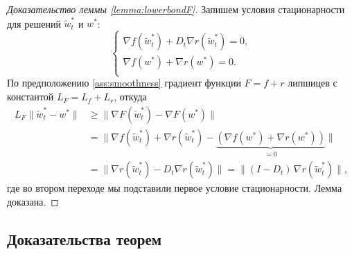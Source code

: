 \begin{proof}[Доказательство леммы \ref{lemma:lowerbondF}]
    Запишем условия стационарности для решений $\widetilde{w}^*_t$ и $w^*$:
        \begin{equation*}
        \begin{cases}
            \nabla f (\widetilde{w}^*_t) + D_t \nabla r(\widetilde{w}^*_t) = 0,\\
            \nabla f (w^*) + \nabla r(w^*) = 0.\\
        \end{cases}
        \end{equation*}
        По предположению \ref{ass:smoothness} градиент функции $F = f + r$ липшицев с константой $L_F = L_f + L_r$, откуда
        \begin{equation*}
        \begin{split}
        L_F \|\widetilde{w}^*_t - w^* \| &\geq \| \nabla F(\widetilde{w}^*_t) - \nabla F(w^*)\| \\
        &= \| \nabla f (\widetilde{w}^*_t) + \nabla r(\widetilde{w}^*_t) - \underbrace{\left(\nabla f (w^*) + \nabla r (w^*)\right)}_{=0} \| \\
        &= \| \nabla r(\widetilde{w}^*_t) - D_t \nabla r (\widetilde{w}^*_t) \|  = \| (I - D_t)\, \nabla r (\widetilde{w}^*_t) \|,
        \end{split}
        \end{equation*}
    где во втором переходе мы подставили первое условие стационарности. Лемма доказана.
\end{proof}

\subsection{Доказательства теорем}
\label{appendix:theorems}

